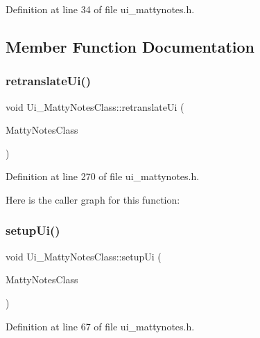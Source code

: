 Definition at line 34 of file ui\+\_\+mattynotes.\+h.



\subsection{Member Function Documentation}
\hypertarget{classUi__MattyNotesClass_a3a5915db60e9488bd96bf4ea0c844422}{}\label{classUi__MattyNotesClass_a3a5915db60e9488bd96bf4ea0c844422} 
\subsubsection{\texorpdfstring{retranslate\+Ui()}{retranslateUi()}}
{\footnotesize\ttfamily void Ui\+\_\+\+Matty\+Notes\+Class\+::retranslate\+Ui (\begin{DoxyParamCaption}\item[{Q\+Main\+Window $\ast$}]{Matty\+Notes\+Class }\end{DoxyParamCaption})\hspace{0.3cm}{\ttfamily [inline]}}



Definition at line 270 of file ui\+\_\+mattynotes.\+h.

Here is the caller graph for this function\+:
\hypertarget{classUi__MattyNotesClass_a33a88ea08595a64d445a104fcdfb4e7c}{}\label{classUi__MattyNotesClass_a33a88ea08595a64d445a104fcdfb4e7c} 
\subsubsection{\texorpdfstring{setup\+Ui()}{setupUi()}}
{\footnotesize\ttfamily void Ui\+\_\+\+Matty\+Notes\+Class\+::setup\+Ui (\begin{DoxyParamCaption}\item[{Q\+Main\+Window $\ast$}]{Matty\+Notes\+Class }\end{DoxyParamCaption})\hspace{0.3cm}{\ttfamily [inline]}}



Definition at line 67 of file ui\+\_\+mattynotes.\+h.

